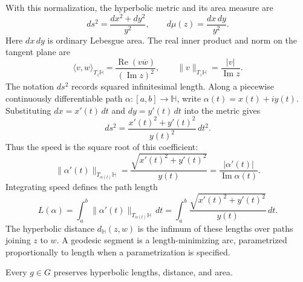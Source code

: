 \begin{definition}\label{hyperbolic.metric}
With this normalization, the hyperbolic metric and its area measure are
\begin{equation}\label{eq:half-plane-metric-area}
 ds^2=\frac{dx^2+dy^2}{y^2},\qquad d\mu(z)=\frac{dx\,dy}{y^2}.
\end{equation}
Here $dx\,dy$ is ordinary Lebesgue area. The real inner product and norm on the tangent plane are
\[
 \langle v,w\rangle_{T_z\mathbb H}
 =\frac{\operatorname{Re}(v\overline w)}{(\operatorname{Im}z)^2},
 \qquad \|v\|_{T_z\mathbb H}=\frac{|v|}{\operatorname{Im}z}.
\]
The notation $ds^2$ records squared infinitesimal length. Along a piecewise continuously differentiable path $\alpha:[a,b]\to\mathbb H$, write $\alpha(t)=x(t)+iy(t)$. Substituting $dx=x'(t)\,dt$ and $dy=y'(t)\,dt$ into the metric gives
\[
 ds^2=\frac{x'(t)^2+y'(t)^2}{y(t)^2}\,dt^2.
\]
Thus the speed is the square root of this coefficient:
\[
 \|\alpha'(t)\|_{T_{\alpha(t)}\mathbb H}
 =\frac{\sqrt{x'(t)^2+y'(t)^2}}{y(t)}
 =\frac{|\alpha'(t)|}{\operatorname{Im}\alpha(t)}.
\]
Integrating speed defines the path length
\[
 L(\alpha)=\int_a^b\|\alpha'(t)\|_{T_{\alpha(t)}\mathbb H}\,dt
 =\int_a^b\frac{\sqrt{x'(t)^2+y'(t)^2}}{y(t)}\,dt.
\]
The hyperbolic distance $d_{\mathbb H}(z,w)$ is the infimum of these lengths over paths joining $z$ to $w$. A geodesic segment is a length-minimizing arc, parametrized proportionally to length when a parametrization is specified.
\end{definition}

\begin{proposition}\label{hyperbolic.invariance}
Every $g\in G$ preserves hyperbolic lengths, distance, and area.
\end{proposition}


